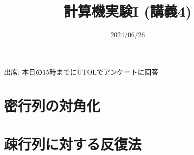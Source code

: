 \documentclass[10pt,dvipdfmx]{beamer}
\title{計算機実験I (講義4)}
\date{2024/06/26}
\begin{document}
\begin{frame}
  \titlepage
  \tableofcontents
  出席: 本日の15時までにUTOLでアンケートに回答
\end{frame}

\section{密行列の対角化}


%

%











%


\section{疎行列に対する反復法}

%











% 
% 





\section{}

\end{document}
